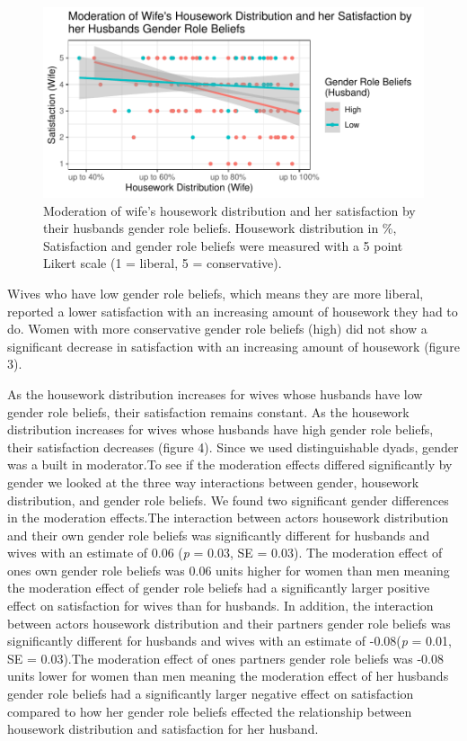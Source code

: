 \documentclass[
  man,floatsintext]{apa6}
\begin{document}
\begin{figure}
\centering
\includegraphics{results_files/figure-latex/unnamed-chunk-13-1.pdf}
\caption{\label{fig:unnamed-chunk-13}Moderation of wife's housework distribution and her satisfaction by their husbands gender role beliefs. Housework distribution in \%, Satisfaction and gender role beliefs were measured with a 5 point Likert scale (1 = liberal, 5 = conservative).}
\end{figure}

Wives who have low gender role beliefs, which means they are more liberal, reported a lower satisfaction with an increasing amount of housework they had to do. Women with more conservative gender role beliefs (high) did not show a significant decrease in satisfaction with an increasing amount of housework (figure 3).

As the housework distribution increases for wives whose husbands have low gender role beliefs, their satisfaction remains constant. As the housework distribution increases for wives whose husbands have high gender role beliefs, their satisfaction decreases (figure 4).
Since we used distinguishable dyads, gender was a built in moderator.To see if the moderation effects differed significantly by gender we looked at the three way interactions between gender, housework distribution, and gender role beliefs. We found two significant gender differences in the moderation effects.The interaction between actors housework distribution and their own gender role beliefs was significantly different for husbands and wives with an estimate of 0.06 (\emph{p} = 0.03, SE = 0.03). The moderation effect of ones own gender role beliefs was 0.06 units higher for women than men meaning the moderation effect of gender role beliefs had a significantly larger positive effect on satisfaction for wives than for husbands.
In addition, the interaction between actors housework distribution and their partners gender role beliefs was significantly different for husbands and wives with an estimate of -0.08(\emph{p} = 0.01, SE = 0.03).The moderation effect of ones partners gender role beliefs was -0.08 units lower for women than men meaning the moderation effect of her husbands gender role beliefs had a significantly larger negative effect on satisfaction compared to how her gender role beliefs effected the relationship between housework distribution and satisfaction for her husband.
\end{document}
